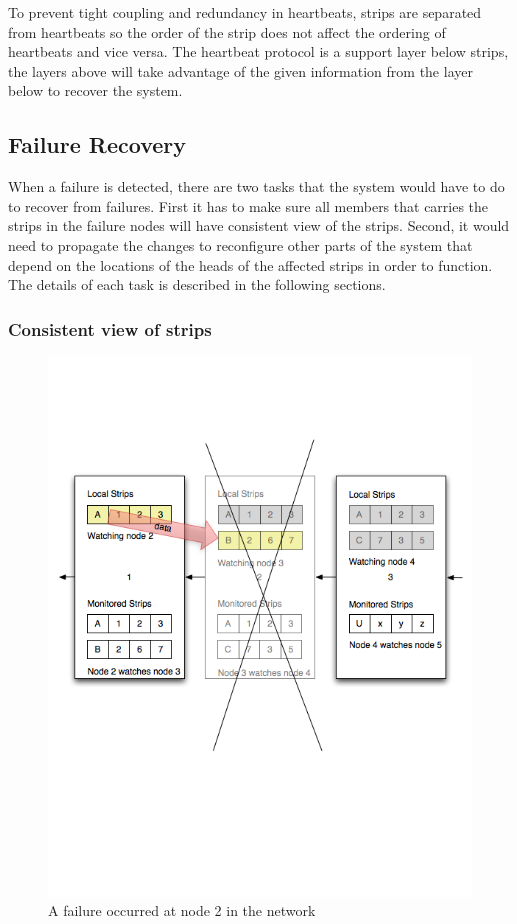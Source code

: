 To prevent tight coupling and redundancy in heartbeats, strips are separated
from heartbeats so the order of the strip does not affect the ordering of
heartbeats and vice versa. The heartbeat protocol is a support layer below
strips, the layers above will take advantage of the given information from the
layer below to recover the system.

\subsection{Failure Recovery}
\label{s:fr}

When a failure is detected, there are two tasks that the system would have to do
to recover from failures. First it has to make sure all members that carries
the strips in the failure nodes will have consistent view of the strips.
Second, it would need to propagate the changes to reconfigure other parts of
the system that depend on the locations of the heads of the affected strips in
order to function. The details of each task is described in the following
sections.

\subsubsection{Consistent view of strips}

\begin{figure}[h!]
\centering
    \includegraphics[width=\linewidth]{figures/strip3}
\caption{A failure occurred at node 2 in the network}
\label{fig:strip3}
\end{figure}

